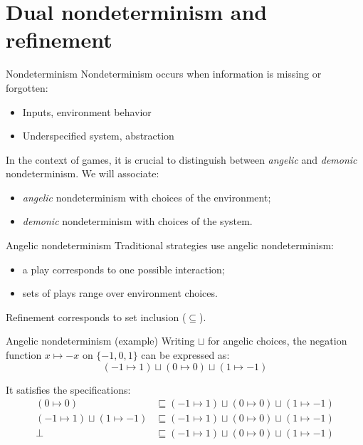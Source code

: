 \documentclass[aspectratio=54]{beamer}
\begin{document}

\section*{Dual nondeterminism and refinement} %

\begin{frame}{Nondeterminism} %
  Nondeterminism occurs
  when information is missing or forgotten:
  \begin{itemize}
    \item Inputs, environment behavior
    \item Underspecified system, abstraction
  \end{itemize}

  In the context of games,
  it is crucial to distinguish between
  \emph{angelic} and \emph{demonic}
  nondeterminism.
  We will associate:
  \begin{itemize}
    \item \emph{angelic} nondeterminism
      with choices of the environment;
    \item \emph{demonic} nondeterminism
      with choices of the system.
  \end{itemize}
\end{frame}

\begin{frame}{Angelic nondeterminism} %
  Traditional strategies use angelic nondeterminism:
  \begin{itemize}
    \item a play corresponds to one possible interaction;
    \item sets of plays range over environment choices.
  \end{itemize}
  Refinement corresponds to set inclusion ($\subseteq$).
\end{frame}

\begin{frame}{Angelic nondeterminism (example)} %
  Writing $\sqcup$ for angelic choices,
  the negation function $x \mapsto - x$ on $\{-1, 0, 1\}$
  can be expressed as:
  \[
    (-1 \mapsto 1) \sqcup (0 \mapsto 0) \sqcup (1 \mapsto -1)
  \]

  It satisfies the specifications:
  \begin{align*}
    (0 \mapsto 0) &\sqsubseteq
      (-1 \mapsto 1) \sqcup (0 \mapsto 0) \sqcup (1 \mapsto -1) \\
    (-1 \mapsto 1) \sqcup (1 \mapsto -1) &\sqsubseteq
      (-1 \mapsto 1) \sqcup (0 \mapsto 0) \sqcup (1 \mapsto -1) \\
    \bot &\sqsubseteq
      (-1 \mapsto 1) \sqcup (0 \mapsto 0) \sqcup (1 \mapsto -1)
  \end{align*}
\end{frame}
\end{document}
